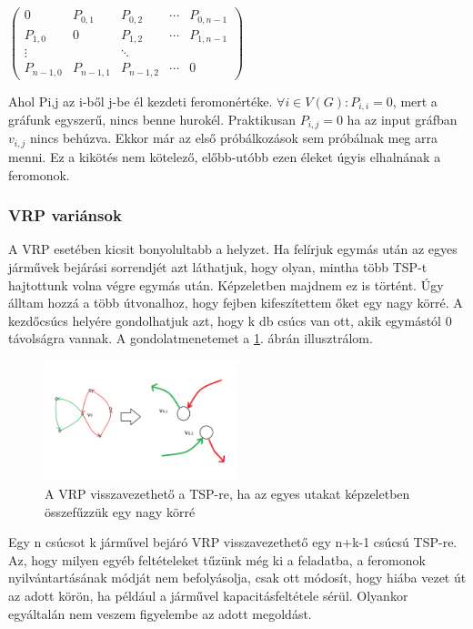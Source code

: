 $\begin{pmatrix}
	0 & P_{0,1} & P_{0,2} & \cdots & P_{0,n-1}\\ 
	P_{1,0} & 0 & P_{1,2} & \cdots & P_{1,n-1} \\
	\vdots & & \ddots \\
	P_{n-1,0} & P_{n-1,1} & P_{n-1,2} & \cdots & 0
\end{pmatrix}$

Ahol P{\scriptsize i,j} az i-ből j-be él kezdeti feromonértéke. \( \forall i\in V(G) : P_{i,i}=0 \), mert a gráfunk egyszerű, nincs benne hurokél. Praktikusan \( P_{i,j}=0 \) ha az input gráfban \(v_{i,j}\) nincs behúzva. Ekkor már az első próbálkozások sem próbálnak meg arra menni. Ez a kikötés nem kötelező, előbb-utóbb ezen éleket úgyis elhalnának a feromonok. 

\subsubsection{VRP variánsok}
A VRP esetében kicsit bonyolultabb a helyzet. Ha felírjuk egymás után az egyes járművek bejárási sorrendjét azt láthatjuk, hogy olyan, mintha több TSP-t hajtottunk volna végre egymás után. Képzeletben majdnem ez is történt. Úgy álltam hozzá a több útvonalhoz, hogy fejben kifeszítettem őket egy nagy körré. A kezdőcsúcs helyére gondolhatjuk azt, hogy k db csúcs van ott, akik egymástól 0 távolságra vannak. A gondolatmenetemet a \ref{tsp-to-vrp}. ábrán illusztrálom. 

\begin{figure}[ht!]
	\centering
	\includegraphics[width=0.5\textwidth]{figures/tsp-to-vrp.png}
	\caption{A VRP visszavezethető a TSP-re, ha az egyes utakat képzeletben összefűzzük egy nagy körré \label{tsp-to-vrp} }
\end{figure}

Egy n csúcsot k járművel bejáró VRP visszavezethető egy n+k-1 csúcsú TSP-re. Az, hogy milyen egyéb feltételeket tűzünk még ki a feladatba, a feromonok nyilvántartásának módját nem befolyásolja, csak ott módosít, hogy hiába vezet út az adott körön, ha például a járművel kapacitásfeltétele sérül. Olyankor egyáltalán nem veszem figyelembe az adott megoldást.

